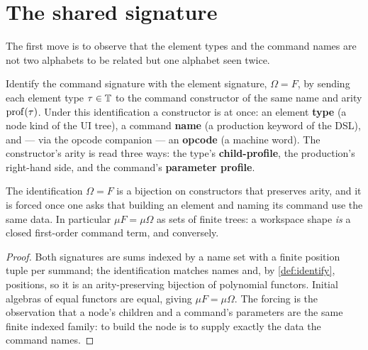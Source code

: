 \documentclass[../uxoxo-main]{subfiles}
\begin{document}

\section{The shared signature}\label{sec:shared}
The first move is to observe that the element types and the command names are not
two alphabets to be related but one alphabet seen twice.

\begin{definition}\label{def:identify}
Identify the command signature with the element signature, $\Omega = F$, by
sending each element type $\tau\in\mathbb{T}$ to the command constructor of the same
name and arity $\mathrm{prof}(\tau)$. Under this identification a constructor is at once:
an element \textbf{type} (a node kind of the UI tree), a command \textbf{name} (a
production keyword of the DSL), and --- via the opcode companion --- an
\textbf{opcode} (a machine word). The constructor's arity is read three ways: the
type's \textbf{child-profile}, the production's right-hand side, and the command's
\textbf{parameter profile}.
\end{definition}

\begin{proposition}\label{prop:typesconstructors}
The identification $\Omega=F$ is a bijection on constructors that preserves arity,
and it is forced once one asks that building an element and naming its command use
the same data. In particular $\mu F=\mu\Omega$ as sets of finite trees: a
workspace shape \emph{is} a closed first-order command term, and conversely.
\end{proposition}

\begin{proof}
Both signatures are sums indexed by a name set with a finite position tuple per
summand; the identification matches names and, by \cref{def:identify}, positions,
so it is an arity-preserving bijection of polynomial functors. Initial algebras of
equal functors are equal, giving $\mu F=\mu\Omega$. The forcing is the observation
that a node's children and a command's parameters are the same finite indexed
family: to build the node is to supply exactly the data the command names.
\end{proof}
\end{document}
